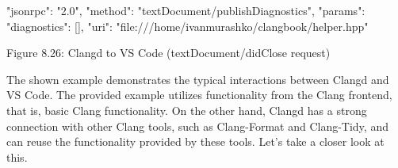 \begin{shell}
{
  "jsonrpc": "2.0",
  "method": "textDocument/publishDiagnostics",
  "params": {
    "diagnostics": [],
    "uri": "file:///home/ivanmurashko/clangbook/helper.hpp"
  }
}
\end{shell}

\begin{center}
Figure 8.26: Clangd to VS Code (textDocument/didClose request)
\end{center}

The shown example demonstrates the typical interactions between Clangd and VS Code. The provided example utilizes functionality from the Clang frontend, that is, basic Clang functionality. On the other hand, Clangd has a strong connection with other Clang tools, such as Clang-Format and Clang-Tidy, and can reuse the functionality provided by these tools. Let’s take a closer look at this.
























